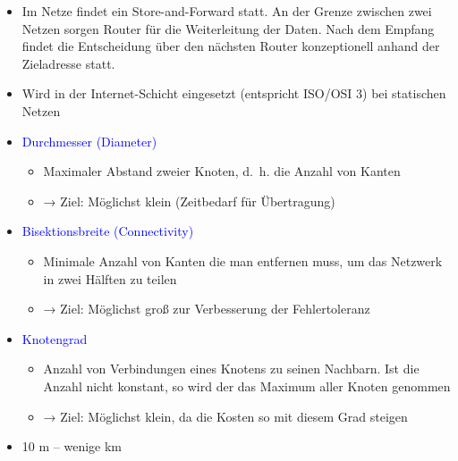 \begin{itemize}
    \item Im Netze findet ein Store-and-Forward statt.
    An der Grenze zwischen zwei Netzen sorgen Router für die Weiterleitung der Daten.
    Nach dem Empfang findet die Entscheidung über den nächsten Router konzeptionell anhand der Zieladresse statt.
    \item Wird in der Internet-Schicht eingesetzt (entspricht ISO/OSI 3) bei statischen Netzen
\end{itemize}

\begin{itemize}
    \item \textcolor{blue}{Durchmesser (Diameter)}
    \begin{itemize}
        \item Maximaler Abstand zweier Knoten, d.\ h. die Anzahl von Kanten
        \item → Ziel: Möglichst klein (Zeitbedarf für Übertragung)
    \end{itemize}
    \item \textcolor{blue}{Bisektionsbreite (Connectivity)}
    \begin{itemize}
        \item Minimale Anzahl von Kanten die man entfernen muss, um das Netzwerk in zwei Hälften zu teilen
        \item → Ziel: Möglichst groß zur Verbesserung der Fehlertoleranz
    \end{itemize}
    \item \textcolor{blue}{Knotengrad}
    \begin{itemize}
        \item Anzahl von Verbindungen eines Knotens zu seinen Nachbarn.
        Ist die Anzahl nicht konstant, so wird der das Maximum aller Knoten genommen
        \item → Ziel: Möglichst klein, da die Kosten so mit diesem Grad steigen
    \end{itemize}
\end{itemize}

\begin{itemize}
    \item 10 m – wenige km
\end{itemize}

